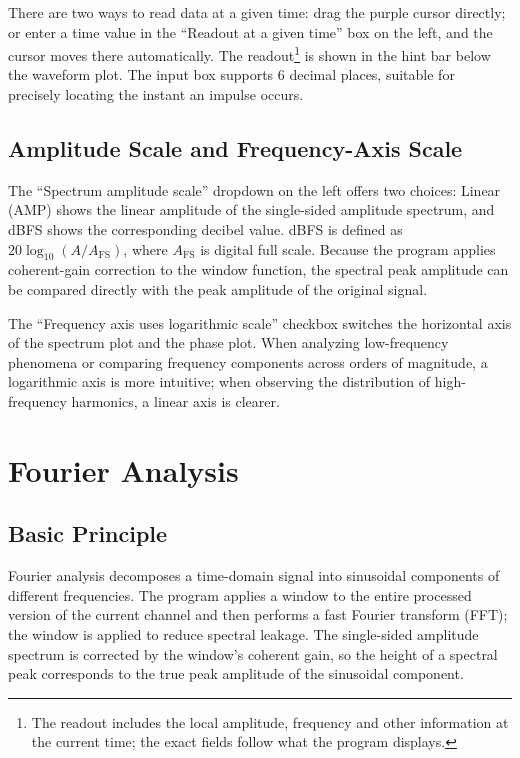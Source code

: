 \documentclass[UTF8,a4paper,12pt]{ctexart}
\begin{document}
There are two ways to read data at a given time: drag the purple cursor directly; or enter a time value in the ``Readout at a given time'' box on the left, and the cursor moves there automatically. The readout\footnote{The readout includes the local amplitude, frequency and other information at the current time; the exact fields follow what the program displays.} is shown in the hint bar below the waveform plot. The input box supports 6 decimal places, suitable for precisely locating the instant an impulse occurs.

\subsection{Amplitude Scale and Frequency-Axis Scale}

The ``Spectrum amplitude scale'' dropdown on the left offers two choices: Linear (AMP) shows the linear amplitude of the single-sided amplitude spectrum, and dBFS shows the corresponding decibel value. dBFS is defined as $20\log_{10}(A/A_{\text{FS}})$, where $A_{\text{FS}}$ is digital full scale. Because the program applies coherent-gain correction to the window function, the spectral peak amplitude can be compared directly with the peak amplitude of the original signal.

The ``Frequency axis uses logarithmic scale'' checkbox switches the horizontal axis of the spectrum plot and the phase plot. When analyzing low-frequency phenomena or comparing frequency components across orders of magnitude, a logarithmic axis is more intuitive; when observing the distribution of high-frequency harmonics, a linear axis is clearer.

\section{Fourier Analysis}

\subsection{Basic Principle}

Fourier analysis decomposes a time-domain signal into sinusoidal components of different frequencies. The program applies a window to the entire processed version of the current channel and then performs a fast Fourier transform (FFT); the window is applied to reduce spectral leakage. The single-sided amplitude spectrum is corrected by the window's coherent gain, so the height of a spectral peak corresponds to the true peak amplitude of the sinusoidal component.
\end{document}
